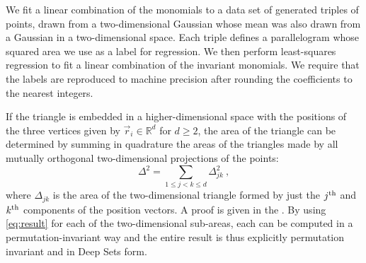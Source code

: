\documentclass[10pt]{article}
\begin{document}
We fit a linear combination of the monomials to a data set of generated triples of points, drawn from a two-dimensional Gaussian whose mean was also drawn from a Gaussian in a two-dimensional space.
Each triple defines a parallelogram whose squared area we use as a label for regression.
We then perform least-squares regression to fit a linear combination of the invariant monomials.
We require that the labels are reproduced to machine precision after rounding the coefficients to the nearest integers.

If the triangle is embedded in a higher-dimensional space with the positions of the three vertices given by $\vec{r}_i \in \mathbb{R}^{d}$ for $d \geq 2$, the area of the triangle can be determined by summing in quadrature the areas of the triangles made by all mutually orthogonal two-dimensional projections of the points:
\begin{equation}
    \Delta^2 = \sum_{1 \leq j < k \leq d} \Delta_{jk}^2~, 
    \label{eq:quadrature}
\end{equation}
where $\Delta_{jk}$ is the area of the two-dimensional triangle formed by just the $j^{\rm th}$ and $k^{\rm th}$ components of the position vectors.
A proof is given in the .
By using \eqref{eq:result} for each of the two-dimensional sub-areas, each can be computed in a permutation-invariant way and the entire result is thus explicitly permutation invariant and in Deep Sets form.
\end{document}

